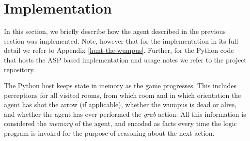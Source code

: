 \documentclass{llncs}
\begin{document}
\section{Implementation}

In this section, we briefly describe how the agent described in the previous section was implemented. Note, however that for the implementation in its full detail we refer to Appendix \ref{hunt-the-wumpus}. Further, for the Python code that hosts the ASP based implementation and usage notes we refer to the project repository.

The Python host keeps state in memory as the game progresses. This includes perceptions for all visited rooms, from which room and in which orientation the agent has shot the arrow (if applicable), whether the wumpus is dead or alive, and whether the agent has ever performed the \emph{grab} action. All this information is considered the \emph{memory} of the agent, and encoded as facts every time the logic program is invoked for the purpose of reasoning about the next action.
\end{document}

